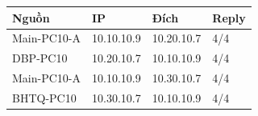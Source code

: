 \begin{tabularx}{\linewidth}{@{}lXXl@{}}\toprule
Nguồn & IP & Đích & Reply\\\midrule
Main-PC10-A & 10.10.10.9 & 10.20.10.7 & 4/4\\
DBP-PC10 & 10.20.10.7 & 10.10.10.9 & 4/4\\
Main-PC10-A & 10.10.10.9 & 10.30.10.7 & 4/4\\
BHTQ-PC10 & 10.30.10.7 & 10.10.10.9 & 4/4\\
\bottomrule\end{tabularx}
